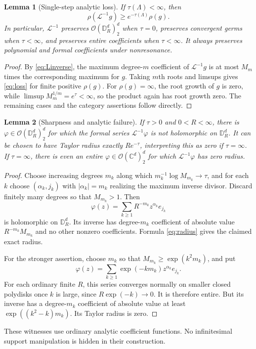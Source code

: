 \documentclass[11pt,letterpaper]{article}
\newtheorem{lemma}[lemma]{Lemma}
\theoremstyle{definition}
\theoremstyle{remark}
\newcommand{\C}{\mathbb C}
\newcommand{\OO}{\mathcal O}
\newcommand{\DR}{\mathbb D_R^d}
\newcommand{\Li}{\mathcal L}
\numberwithin{equation}{section}
\begin{document}
\begin{lemma}[Single-step analytic loss]\label{lem:radius-loss}
If $\tau(\Lambda)<\infty$, then
\begin{equation}\label{eq:loss}
 \rho(\Li^{-1}g)\ge e^{-\tau(\Lambda)}\rho(g).
\end{equation}
In particular, $\Li^{-1}$ preserves $\OO(\DR)_2^d$ when $\tau=0$,
preserves convergent germs when $\tau<\infty$, and preserves entire
coefficients when $\tau<\infty$. It always preserves polynomial and formal
coefficients under nonresonance.
\end{lemma}
\begin{proof}
By \eqref{eq:Linverse}, the maximum degree-$m$ coefficient of
$\Li^{-1}g$ is at most $M_m$ times the corresponding maximum for $g$.
Taking $m$th roots and limsups gives \eqref{eq:loss} for finite positive
$\rho(g)$. For $\rho(g)=\infty$, the root growth of $g$ is zero, while
$\limsup M_m^{1/m}=e^\tau<\infty$, so the product again has root growth
zero. The remaining cases and the category assertions follow directly.
\end{proof}

\begin{lemma}[Sharpness and analytic failure]\label{lem:sharp-divisor}
If $\tau>0$ and $0<R<\infty$, there is $\varphi\in\OO(\DR)_2^d$ for
which the formal series $\Li^{-1}\varphi$ is not holomorphic on $\DR$.
It can be chosen to have Taylor radius exactly $Re^{-\tau}$, interpreting
this as zero if $\tau=\infty$.
If $\tau=\infty$, there is even an \emph{entire}
$\varphi\in\OO(\C^d)_2^d$ for which $\Li^{-1}\varphi$ has zero radius.
\end{lemma}
\begin{proof}
Choose increasing degrees $m_k$ along which
$m_k^{-1}\log M_{m_k}\to\tau$, and for each $k$ choose $(\alpha_k,j_k)$
with $|\alpha_k|=m_k$ realizing the maximum inverse divisor. Discard finitely
many degrees so that $M_{m_k}>1$. Then
\begin{equation}\label{eq:finite-radius-witness}
 \varphi(z)=\sum_{k\ge1}R^{-m_k}z^{\alpha_k}e_{j_k}
\end{equation}
is holomorphic on $\DR$. Its inverse has degree-$m_k$ coefficient of
absolute value $R^{-m_k}M_{m_k}$ and no other nonzero coefficients.
Formula \eqref{eq:radius} gives the claimed exact radius.

For the stronger assertion, choose $m_k$ so that
$M_{m_k}\ge\exp(k^2m_k)$, and put
\begin{equation}\label{eq:entire-witness}
 \varphi(z)=\sum_{k\ge1}\exp(-km_k)z^{\alpha_k}e_{j_k}.
\end{equation}
For each ordinary finite $R$, this series converges normally on smaller
closed polydisks once $k$ is large, since $R\exp(-k)\to0$. It is therefore
entire. But its inverse has a degree-$m_k$ coefficient of absolute value at
least $\exp((k^2-k)m_k)$. Its Taylor radius is zero.
\end{proof}
These witnesses use ordinary analytic coefficient functions. No infinitesimal
support manipulation is hidden in their construction.
\end{document}

